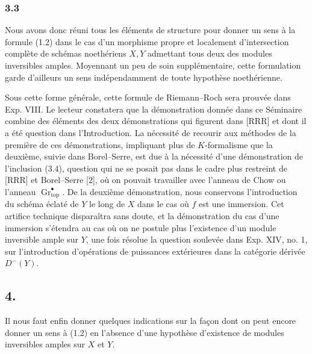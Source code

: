 \documentclass[11pt]{article}
\newcommand{\Gr}{\operatorname{Gr}}
\providecommand{\Gr}{\operatorname{Gr}}
\providecommand{\Gr}{\operatorname{G}}
\begin{document}
\subsubsection*{3.3}
Nous avons donc r\'euni tous les \'el\'ements de structure pour donner un sens \`a la formule (1.2) dans le cas d'un morphisme propre et localement d'intersection compl\`ete de sch\'emas noeth\'eriens $X,Y$ admettant tous deux des modules inversibles amples. Moyennant un peu de soin suppl\'ementaire, cette formulation garde d'ailleurs un sens ind\'ependamment de toute hypoth\`ese noeth\'erienne.

Sous cette forme g\'en\'erale, cette formule de Riemann--Roch sera prouv\'ee dans Exp. VIII. Le lecteur constatera que la d\'emonstration donn\'ee dans ce S\'eminaire combine des \'el\'ements des deux d\'emonstrations qui figurent dans [RRR] et dont il a \'et\'e question dans l'Introduction. La n\'ecessit\'e de recourir aux m\'ethodes de la premi\`ere de ces d\'emonstrations, impliquant plus de $K$-formalisme que la deuxi\`eme, suivie dans Borel--Serre, est due \`a la n\'ecessit\'e d'une d\'emonstration de l'inclusion (3.4), question qui ne se posait pas dans le cadre plus restreint de [RRR] et Borel--Serre [2], o\`u on pouvait travailler avec l'anneau de Chow ou l'anneau $\Gr^\bullet_{\mathrm{top}}$. De la deuxi\`eme d\'emonstration, nous conservons l'introduction du sch\'ema \'eclat\'e de $Y$ le long de $X$ dans le cas o\`u $f$ est une immersion. Cet artifice technique dispara\^itra sans doute, et la d\'emonstration du cas d'une immersion s'\'etendra au cas o\`u on ne postule plus l'existence d'un module inversible ample sur $Y$, une fois r\'esolue la question soulev\'ee dans Exp. XIV, no. 1, sur l'introduction d'op\'erations de puissances ext\'erieures dans la cat\'egorie d\'eriv\'ee $D^-(Y)$.

\subsection*{4.}
Il nous faut enfin donner quelques indications sur la fa\c{c}on dont on peut encore donner un sens \`a (1.2) en l'absence d'une hypoth\`ese d'existence de modules inversibles amples sur $X$ et $Y$.
\end{document}
